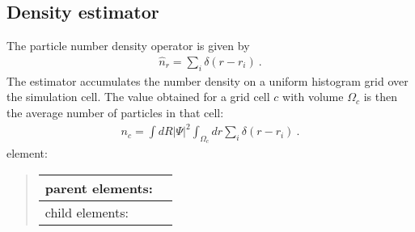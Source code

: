 \documentclass[letterpaper,10pt,english]{sphinxmanual}
\begin{document}
\subsection{Density estimator}
\label{\detokenize{hamiltonianobservable:density-estimator}}
The particle number density operator is given by
\begin{equation}\label{equation:hamiltonianobservable:eq32}
\begin{split}\hat{n}_r = \sum_i\delta(r-r_i)\:.\end{split}
\end{equation}
The  estimator accumulates the number density on a uniform
histogram grid over the simulation cell. The value obtained for a grid
cell \(c\) with volume \(\Omega_c\) is then the average number
of particles in that cell:
\begin{equation}\label{equation:hamiltonianobservable:eq33}
\begin{split}n_c = \int dR \left|{\Psi}\right|^2 \int_{\Omega_c}dr \sum_i\delta(r-r_i)\:.\end{split}
\end{equation}
 element:
\begin{quote}


\begin{savenotes}\sphinxattablestart
\centering
\begin{tabulary}{\linewidth}[t]{|T|T|}
\hline

parent elements:
&
\\
\hline
child elements:
&
\\
\hline
\end{tabulary}
\par
\sphinxattableend\end{savenotes}
\end{quote}
\end{document}
